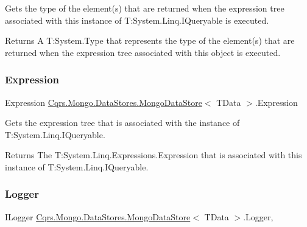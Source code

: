 Gets the type of the element(s) that are returned when the expression tree associated with this instance of T\+:\+System.\+Linq.\+I\+Queryable is executed. 

\begin{DoxyReturn}{Returns}
A T\+:\+System.\+Type that represents the type of the element(s) that are returned when the expression tree associated with this object is executed. 
\end{DoxyReturn}
\mbox{\label{classCqrs_1_1Mongo_1_1DataStores_1_1MongoDataStore_a1a151694ae4eef805bd64aa7a3ae70ed}} 
\subsubsection{\texorpdfstring{Expression}{Expression}}
{\footnotesize\ttfamily Expression \hyperlink{classCqrs_1_1Mongo_1_1DataStores_1_1MongoDataStore}{Cqrs.\+Mongo.\+Data\+Stores.\+Mongo\+Data\+Store}$<$ T\+Data $>$.Expression\hspace{0.3cm}{\ttfamily [get]}}



Gets the expression tree that is associated with the instance of T\+:\+System.\+Linq.\+I\+Queryable. 

\begin{DoxyReturn}{Returns}
The T\+:\+System.\+Linq.\+Expressions.\+Expression that is associated with this instance of T\+:\+System.\+Linq.\+I\+Queryable. 
\end{DoxyReturn}
\mbox{\label{classCqrs_1_1Mongo_1_1DataStores_1_1MongoDataStore_a29e943482b60be2d3d253af59d3fc5eb}} 
\subsubsection{\texorpdfstring{Logger}{Logger}}
{\footnotesize\ttfamily I\+Logger \hyperlink{classCqrs_1_1Mongo_1_1DataStores_1_1MongoDataStore}{Cqrs.\+Mongo.\+Data\+Stores.\+Mongo\+Data\+Store}$<$ T\+Data $>$.Logger\hspace{0.3cm}{\ttfamily [get]}, {\ttfamily [protected]}}

